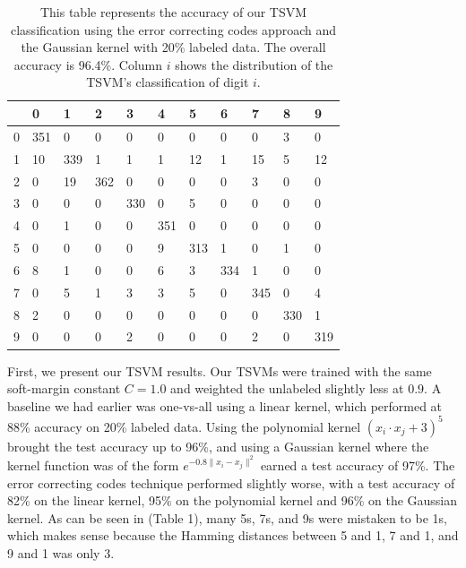 \documentclass[11pt]{article}
\begin{document}
\begin{table}[]
  \label{table:1}
  \centering
  \vspace{.3in}
  \begin{tabular}{l|llllllllll}
    & 0 & 1 & 2 & 3 & 4 & 5 & 6 & 7 & 8 & 9\\\hline
    0 &351 & 0   & 0   & 0   & 0   & 0   & 0   & 0   & 3   & 0   \\
    1 &10   & 339 & 1  & 1   & 1   & 12   & 1   & 15  & 5   & 12  \\
    2 & 0   & 19  & 362 & 0   & 0   & 0   & 0   & 3   & 0   & 0   \\
    3 & 0   & 0   & 0   & 330 & 0   & 5  & 0   & 0   & 0   & 0   \\
    4 & 0   & 1   & 0   & 0   & 351 & 0   & 0   & 0  & 0   & 0   \\
    5 & 0   & 0  & 0   & 0   & 9  & 313 & 1   & 0   & 1  & 0  \\
    6 & 8   & 1   & 0   & 0   & 6   & 3   & 334 & 1   & 0   & 0   \\
    7 & 0   & 5   & 1   & 3   & 3   & 5   & 0   & 345 & 0   & 4   \\
    8 & 2  & 0   & 0   & 0   & 0   & 0   & 0   & 0   & 330 & 1   \\
    9 & 0   & 0   & 0   & 2   & 0  & 0  & 0   & 2   & 0   & 319
  \end{tabular}
  \caption{This table represents the accuracy of our TSVM classification using
  the error correcting codes approach and the Gaussian kernel
  with 20\% labeled data. The overall accuracy is 96.4\%. Column $i$ shows the distribution of the TSVM's classification of digit $i$.}
  \end{table}
First, we present our TSVM results. Our TSVMs were trained with the same soft-margin constant $C=1.0$ and weighted the unlabeled slightly less at $0.9$.
A baseline we had earlier was one-vs-all using a linear kernel,
which performed at 88\% accuracy on 20\% labeled data. Using the polynomial
kernel $(x_i\cdot x_j + 3)^5$
brought the test accuracy up to 96\%, and using a Gaussian kernel
where the kernel function was of the form $e^{-0.8\|x_i-x_j\|^2}$
earned a test accuracy of 97\%. The error correcting codes technique
performed slightly worse, with a test accuracy of 82\% on the linear kernel,
95\% on the polynomial kernel and 96\% on the Gaussian kernel. As can be seen in (Table 1),
many 5s, 7s, and 9s were mistaken to be 1s, which makes sense because the Hamming distances between 5 and 1, 7 and 1, and 9 and 1 was only 3.
\end{document}

